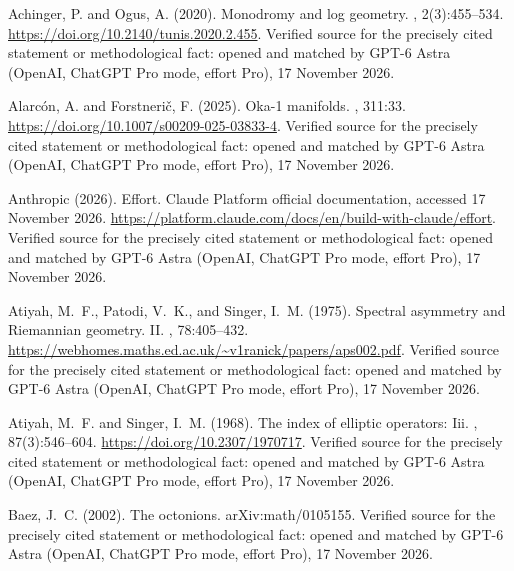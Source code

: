 \begin{thebibliography}{}

Achinger, P. and Ogus, A. (2020).
\newblock Monodromy and log geometry.
, 2(3):455--534.
\newblock \url{https://doi.org/10.2140/tunis.2020.2.455}. Verified source for the precisely cited statement or methodological fact: opened and matched by GPT-6 Astra (OpenAI, ChatGPT Pro mode, effort Pro), 17 November 2026.

Alarc{\'o}n, A. and Forstneri{\v c}, F. (2025).
\newblock Oka-1 manifolds.
, 311:33.
\newblock \url{https://doi.org/10.1007/s00209-025-03833-4}. Verified source for the precisely cited statement or methodological fact: opened and matched by GPT-6 Astra (OpenAI, ChatGPT Pro mode, effort Pro), 17 November 2026.

{Anthropic} (2026).
\newblock Effort.
\newblock Claude Platform official documentation, accessed 17 November 2026.
\newblock \url{https://platform.claude.com/docs/en/build-with-claude/effort}. Verified source for the precisely cited statement or methodological fact: opened and matched by GPT-6 Astra (OpenAI, ChatGPT Pro mode, effort Pro), 17 November 2026.

Atiyah, M.~F., Patodi, V.~K., and Singer, I.~M. (1975).
\newblock Spectral asymmetry and {Riemannian} geometry. {II}.
, 78:405--432.
\newblock \url{https://webhomes.maths.ed.ac.uk/~v1ranick/papers/aps002.pdf}. Verified source for the precisely cited statement or methodological fact: opened and matched by GPT-6 Astra (OpenAI, ChatGPT Pro mode, effort Pro), 17 November 2026.

Atiyah, M.~F. and Singer, I.~M. (1968).
\newblock The index of elliptic operators: Iii.
, 87(3):546--604.
\newblock \url{https://doi.org/10.2307/1970717}. Verified source for the precisely cited statement or methodological fact: opened and matched by GPT-6 Astra (OpenAI, ChatGPT Pro mode, effort Pro), 17 November 2026.

Baez, J.~C. (2002).
\newblock The octonions.
\newblock arXiv:math/0105155. Verified source for the precisely cited statement or methodological fact: opened and matched by GPT-6 Astra (OpenAI, ChatGPT Pro mode, effort Pro), 17 November 2026.


\end{thebibliography}
